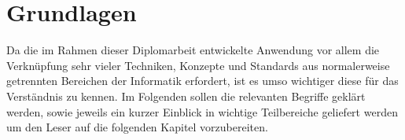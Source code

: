 \chapter{Grundlagen}

Da die im Rahmen dieser Diplomarbeit entwickelte Anwendung vor allem die  Verknüpfung sehr vieler
Techniken, Konzepte und Standards aus normalerweise  getrennten Bereichen der Informatik erfordert,
ist es umso wichtiger diese für  das Verständnis zu kennen. Im Folgenden sollen die relevanten
Begriffe geklärt werden, sowie jeweils ein kurzer Einblick in wichtige Teilbereiche geliefert werden
um den Leser auf die folgenden Kapitel vorzubereiten.



\clearpage



\clearpage

